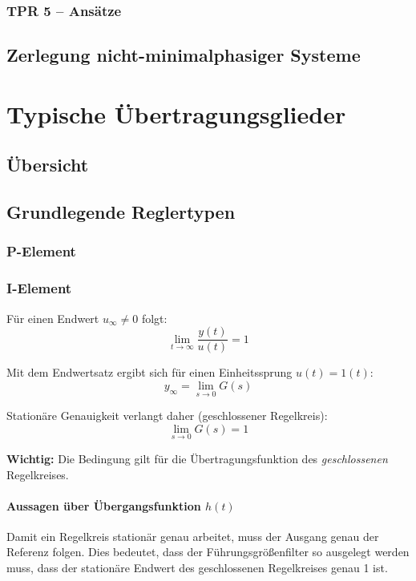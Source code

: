 \documentclass[12pt]{article}
\begin{document}
\subsubsection{TPR 5 – Ansätze}


\subsection{Zerlegung nicht-minimalphasiger Systeme}

\clearpage
\section{Typische Übertragungsglieder}
\subsection{Übersicht}
\subsection{Grundlegende Reglertypen}
\subsubsection{P-Element}
\subsubsection{I-Element}
\noindent Für einen Endwert \(u_{\infty}\neq 0\) folgt:
\[
\lim_{t\to\infty}\frac{y(t)}{u(t)}=1
\]

\noindent Mit dem Endwertsatz ergibt sich für einen Einheitssprung \(u(t) = 1(t)\):
\[
y_{\infty}=\lim_{s\to 0} G(s)
\]

\noindent Stationäre Genauigkeit verlangt daher (geschlossener Regelkreis):
\[
{\lim_{s\to 0} G(s)=1}
\]

\textbf{Wichtig:} Die Bedingung gilt für die Übertragungsfunktion des \emph{geschlossenen} Regelkreises.


\paragraph{Aussagen über Übergangsfunktion \(h(t)\)}
\noindent Damit ein Regelkreis stationär genau arbeitet, muss der Ausgang genau der Referenz folgen. Dies bedeutet, dass der Führungsgrößenfilter so ausgelegt werden muss, dass der stationäre Endwert des geschlossenen Regelkreises genau 1 ist.
\end{document}
